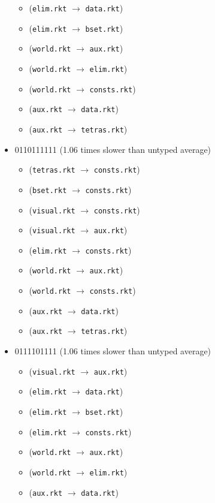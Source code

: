 \documentclass{article}
\newcommand{\mono}[1]{\texttt{#1}}
\begin{document}
\begin{itemize}
\begin{itemize}
  \item (\mono{elim.rkt} $\rightarrow$ \mono{data.rkt})
  \item (\mono{elim.rkt} $\rightarrow$ \mono{bset.rkt})
  \item (\mono{world.rkt} $\rightarrow$ \mono{aux.rkt})
  \item (\mono{world.rkt} $\rightarrow$ \mono{elim.rkt})
  \item (\mono{world.rkt} $\rightarrow$ \mono{consts.rkt})
  \item (\mono{aux.rkt} $\rightarrow$ \mono{data.rkt})
  \item (\mono{aux.rkt} $\rightarrow$ \mono{tetras.rkt})
  \end{itemize}
\item 0110111111 (1.06 times slower than untyped average)
  \begin{itemize}
  \item (\mono{tetras.rkt} $\rightarrow$ \mono{consts.rkt})
  \item (\mono{bset.rkt} $\rightarrow$ \mono{consts.rkt})
  \item (\mono{visual.rkt} $\rightarrow$ \mono{consts.rkt})
  \item (\mono{visual.rkt} $\rightarrow$ \mono{aux.rkt})
  \item (\mono{elim.rkt} $\rightarrow$ \mono{consts.rkt})
  \item (\mono{world.rkt} $\rightarrow$ \mono{aux.rkt})
  \item (\mono{world.rkt} $\rightarrow$ \mono{consts.rkt})
  \item (\mono{aux.rkt} $\rightarrow$ \mono{data.rkt})
  \item (\mono{aux.rkt} $\rightarrow$ \mono{tetras.rkt})
  \end{itemize}
\item 0111101111 (1.06 times slower than untyped average)
  \begin{itemize}
  \item (\mono{visual.rkt} $\rightarrow$ \mono{aux.rkt})
  \item (\mono{elim.rkt} $\rightarrow$ \mono{data.rkt})
  \item (\mono{elim.rkt} $\rightarrow$ \mono{bset.rkt})
  \item (\mono{elim.rkt} $\rightarrow$ \mono{consts.rkt})
  \item (\mono{world.rkt} $\rightarrow$ \mono{aux.rkt})
  \item (\mono{world.rkt} $\rightarrow$ \mono{elim.rkt})
  \item (\mono{aux.rkt} $\rightarrow$ \mono{data.rkt})

\end{itemize}
\end{itemize}
\end{document}
